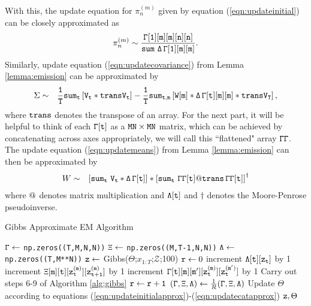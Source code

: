 \documentclass{amsart}
\begin{document}
With this, the update equation for $\pi_n^{(m)}$ given by 
equation (\ref{eqn:updateinitial}) can be closely approximated as 
\begin{eqnarray}\label{eqn:updateinitialapprox}
\pi_n^{(m)} \sim\frac{{\tt \Gamma[1][m][m][n][n]}}{{\tt sum 
\,\,\Delta\,\Gamma[1][m][m]}}.
\end{eqnarray} 
Similarly, update equation 
(\ref{eqn:updatecovariance}) from Lemma \ref{lemma:emission} can be approximated by 
\begin{eqnarray}\label{eqn:updatecovarianceapprox}
\Sigma & \sim& 
{\tt\frac{1}{T}}
{\tt sum_t}
\left[
{\tt V_t*transV_t}
\right] - 
{\tt\frac{1}{T}}
{\tt sum_{t,m} }
\left[
{\tt W[m] *\Delta\,\Gamma[t][m][m]*trans V_T}
\right],
\end{eqnarray}
where ${\tt trans}$ denotes the transpose of an array.  For the next 
part, it will be helpful to think of each ${\tt \Gamma[t]}$ as a ${\tt 
MN\times MN}$ matrix, which can be achieved by concatenating across axes 
appropriately, we will call this ``flattened" array ${\tt \Gamma\Gamma}$.  
The update equation (\ref{eqn:updatemeans}) from Lemma 
\ref{lemma:emission} can then be 
approximated by 
\begin{eqnarray}\label{eqn:updatemeansapprox}
W & \sim & \left[{\tt sum_t\,\, V_t *\Delta\,\Gamma[t]}\right] * 
\left[{\tt sum_t\,\,\Gamma\Gamma[t]@trans\,\Gamma\Gamma[t]}\right]^\dagger
\end{eqnarray}
where ${\tt @}$ denotes matrix multiplication and  
${\tt \Lambda[t]}$ and $\dagger$ denotes the Moore-Penrose 
pseudoinverse.

\begin{algorithm}
  \caption{Gibbs Approximate EM Algorithm\label{alg:gibbs_learning}}
  \begin{algorithmic}[1]
    \State ${\tt \Gamma}\leftarrow$ {\tt np.zeros((T,M,N,N))}
    \State ${\tt \Xi}\leftarrow$ {\tt np.zeros((M,T-1,N,N))}
    \State ${\tt \Lambda}\leftarrow$ {\tt np.zeros((T,M**N))}
    \State $\tt{z} \leftarrow$ {\sc Gibbs}($\Theta$;$x_{1:T}$;$\mathcal 
		Z$;100) 
    \State ${\tt r}\leftarrow 0$
		\State increment ${\tt\Lambda[t][z_t]}$ by 1
				\State increment ${\tt \Xi[m][t][z_t^{(m)}][z_{t+1}^{(m)}]}$ by 1
			\EndIf
				\State increment ${\tt 
				\Gamma[t][m][m'][z_t^{(m)}][z_{t}^{(m')}]}$ by 1
			\EndFor
			\State Carry out steps 6-9 of Algorithm \ref{alg:gibbs}
		\EndFor
      \EndFor
      \State ${\tt r}\leftarrow {\tt r+1}$
      \EndWhile
      \State $({\tt \Gamma,\Xi,\Lambda})\leftarrow \frac{1}{R}({\tt 
      \Gamma,\Xi,\Lambda})$
      \State Update $\Theta$ according to equations 
      (\ref{eqn:updateinitialapprox})-(\ref{eqn:updatecatapprox})
      \State\Return ${\tt z},\Theta$
    \EndFunction
  \end{algorithmic}
\end{algorithm}
\end{document}
